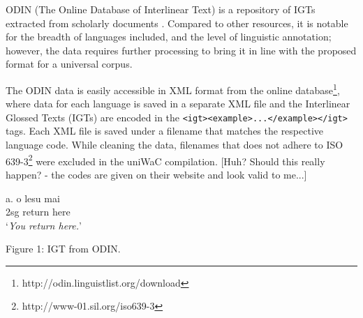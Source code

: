 \documentclass[11pt]{article}
\begin{document}
ODIN (The Online Database of Interlinear Text) is a repository of IGTs extracted from scholarly documents \cite{lewis2006odin,lewis2010odin}.  Compared to other resources, it is notable for the breadth of languages included, and the level of linguistic annotation; however, the data requires further processing to bring it in line with the proposed format for a universal corpus.

The ODIN data is easily accessible in XML format from the online database\footnote{http://odin.linguistlist.org/download}, where data for each language is saved in a separate XML file and the Interlinear Glossed Texts (IGTs) are encoded in the \texttt{<igt><example>...</example></igt>} tags. Each XML file is saved under a filename that matches the respective language code. While cleaning the data, filenames that does not adhere to ISO 639-3\footnote{http://www-01.sil.org/iso639-3} were excluded in the uniWaC compilation. [Huh? Should this really happen? - the codes are given on their website and look valid to me...]

\begin{minipage}{\columnwidth}

a. \quad o lesu mai \\
\indent \qquad 2sg return here \\

\indent \qquad `\emph{You return here.}' \\
\centerline{Figure 1: IGT from ODIN.}
\end{minipage}
\end{document}
